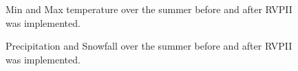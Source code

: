 \documentclass{article}
\begin{document}
\begin{figure}[h]

\caption{\label{fig:control_doyA2}Min and Max temperature over the summer before and after RVPII was implemented.}
\end{figure}

\begin{figure}[h]

\caption{\label{fig:control_doyB2}Precipitation and Snowfall over the summer before and after RVPII was implemented.}
\end{figure}
\end{document}
